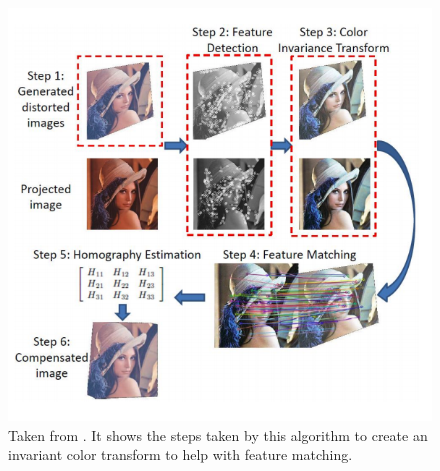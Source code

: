 \documentclass[12pt]{article} %
\begin{document}
\begin{figure}
\includegraphics[width=\textwidth]{Color_invariant.png}
\caption{Taken from \cite{Setkov:2013:CIF:2466715.2466731}. It shows the steps taken by this algorithm to create an invariant color transform to help with feature matching.}
\label{fig:Color_invariant}
\end{figure}



\end{document}
